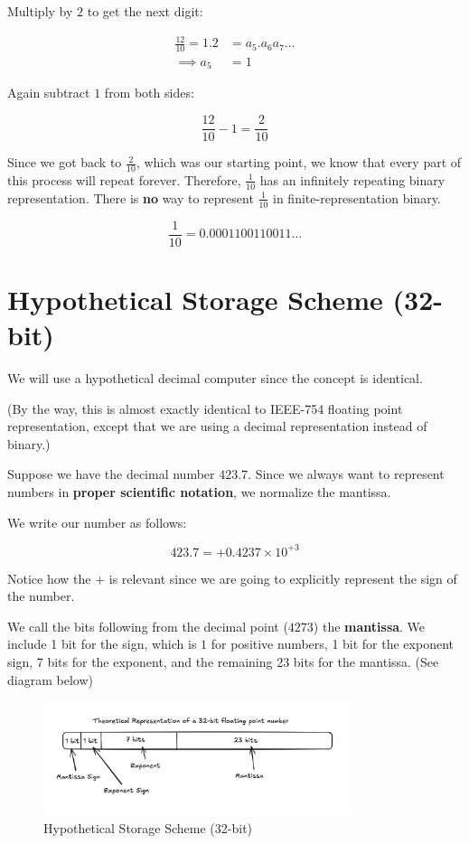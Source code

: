 Multiply by $2$ to get the next digit:

\begin{align*}
  \frac{12}{10} = 1.2 &= a_5.a_6 a_7\dots \\
  \implies a_5 &= 1
\end{align*}

Again subtract $1$ from both sides:

\begin{equation*}
  \frac{12}{10} - 1 = \frac{2}{10} 
\end{equation*}

Since we got back to $\frac{2}{10}$, which was our starting point, we know that
every part of this process will repeat forever. Therefore, $\frac{1}{10}$ has
an infinitely repeating binary representation. There is \textbf{no} way to 
represent $\frac{1}{10}$ in finite-representation binary.

\begin{equation*}
  \frac{1}{10} = 0.0001100110011\dots
\end{equation*}

\section{Hypothetical Storage Scheme (32-bit)}

We will use a hypothetical decimal computer since the concept is identical.

(By the way, this is almost exactly identical to IEEE-754 floating point
representation, except that we are using a decimal representation instead of
binary.)

Suppose we have the decimal number $423.7$. Since we always want to represent
numbers in \textbf{proper scientific notation}, we normalize the mantissa.

We write our number as follows:

\begin{equation*}
  423.7 = +0.4237 \times 10^{+3}
\end{equation*}

Notice how the $+$ is relevant since we are going to explicitly represent the
sign of the number.

We call the bits following from the decimal point ($4273$) the \textbf{mantissa}.
We include 1 bit for the sign, which is $1$ for positive numbers, 1 bit for the
exponent sign, 7 bits for the exponent, and the remaining 23 bits for the
mantissa. (See diagram below)

\begin{figure}[h]
  \centering
  \includegraphics[width=0.8\textwidth]{./assets/fake_ieee754.png}
  \caption{Hypothetical Storage Scheme (32-bit)}
\end{figure}

